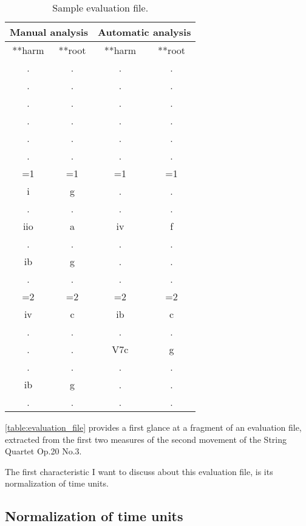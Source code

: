 	\begin{table}[tbp]
	\centering
	\begin{tabular}{|cc|cc|}
	\hline
	\multicolumn{2}{|c|}{Manual analysis} & \multicolumn{2}{c|}{Automatic analysis} \\ \hline
	**harm & **root & **harm & **root \\
	. & . & . & . \\
	. & . & . & . \\
	. & . & . & . \\
	. & . & . & . \\
	. & . & . & . \\
	. & . & . & . \\
	=1 & =1 & =1 & =1 \\
	i & g & . & . \\
	. & . & . & . \\
	iio & a & iv & f \\
	. & . & . & . \\
	ib & g & . & . \\
	. & . & . & . \\
	=2 & =2 & =2 & =2 \\
	iv & c & ib & c \\
	. & . & . & . \\
	. & . & V7c & g \\
	. & . & . & . \\
	ib & g & . & . \\
	. & . & . & . \\ \hline
	\end{tabular}
	\caption{Sample evaluation file.}
	\label{table:evaluation_file}
	\end{table}

	\autoref{table:evaluation_file} provides a first glance at a fragment of an evaluation file, extracted from the first two measures of the second movement of the String Quartet Op.20 No.3.

	The first characteristic I want to discuss about this evaluation file, is its normalization of time units.

  \subsection{Normalization of time units}


